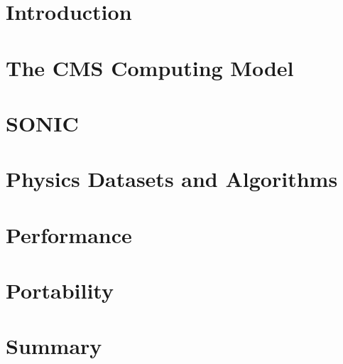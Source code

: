 \section{Introduction}
\label{sec:intro}


\section{The CMS Computing Model}
\label{sec:cmscomputing}


\section{SONIC}
\label{sec:sonic}



\section{Physics Datasets and Algorithms}
\label{sec:algo}



\section{Performance}
\label{sec:performances}


\section{Portability}
\label{sec:IPUs}


\section{Summary}
\label{sec:summary}



\clearpage
\begin{acknowledgments}
\end{acknowledgments}


